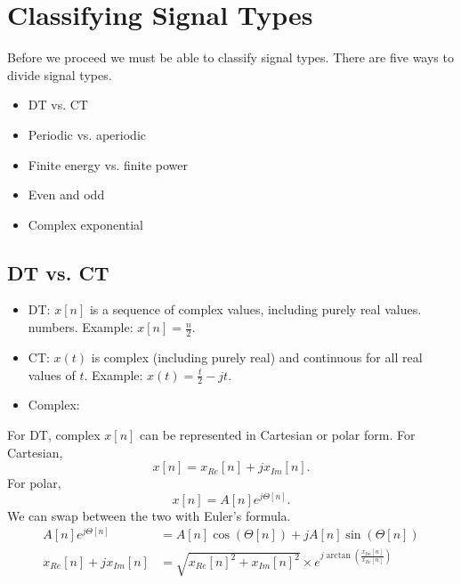 \section{Classifying Signal Types}
Before we proceed we must be able to classify signal types.
There are five ways to divide signal types.
\begin{itemize}
    \item DT vs. CT
    \item Periodic vs. aperiodic
    \item Finite energy vs. finite power
    \item Even and odd
    \item Complex exponential
\end{itemize}

\subsection{DT vs. CT}
\begin{itemize}
    \item DT: $x[n]$ is a sequence of complex values, including purely real values.
          numbers. Example: $x[n] = \frac{n}{2}$.
    \item CT: $x(t)$ is complex (including purely real) and continuous for all real values of $t$.
          Example: $x(t) = \frac{t}{2} -jt$.
    \item Complex:
\end{itemize}

For DT, complex $x[n]$ can be represented in Cartesian or polar form.
For Cartesian,
\begin{equation}
    x[n] = x_{Re}[n] + jx_{Im}[n].
\end{equation}
For polar,
\begin{equation}
    x[n] = A[n]e^{j\Theta[n]}.
\end{equation}
We can swap between the two with Euler's formula.
\begin{align}
    A[n]e^{j\Theta[n]}     & = A[n]\cos(\Theta[n]) + jA[n]\sin(\Theta[n])                                        \\
    x_{Re}[n] + jx_{Im}[n] & = \sqrt{x_{Re}[n]^2 + x_{Im}[n]^2} \times e^{j\arctan(\frac{x_{Im}[n]}{x_{Re}[n]})}
\end{align}

